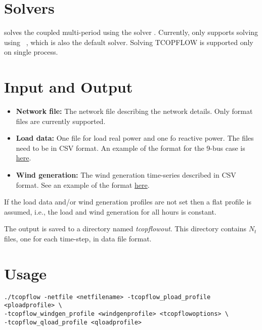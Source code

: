 \section{Solvers}\label{sec:tcopflow_solvers}%
\tcopflow solves the coupled multi-period using the solver \ipopt. Currently, \exago only supports solving \tcopflow using \ipopt~, which is also the default solver. Solving TCOPFLOW is supported only on single process. %

\section{Input and Output}
\begin{itemize}
    \item \textbf{Network file:} The network file describing the network details. Only \matpower format files are currently supported.
    \item \textbf{Load data:} One file for load real power and one fo reactive power. The files need to be in CSV format. An example of the format for the 9-bus case is \href{https://gitlab.pnnl.gov/exasgd/frameworks/exago/-/tree/master/datafiles/case9}{here}.
    \item \textbf{Wind generation:} The wind generation time-series described in CSV format. See an example of the format \href{https://gitlab.pnnl.gov/exasgd/frameworks/exago/-/tree/master/datafiles/case9}{here}.
\end{itemize}
If the load data and/or wind generation profiles are not set then a flat profile is assumed, i.e., the load and wind generation for all hours is constant.

The \tcopflow output is saved to a directory named \emph{tcopflowout}. This directory contains $N_t$ files, one for each time-step, in \matpower data file format.

\section{Usage}
\begin{lstlisting}
./tcopflow -netfile <netfilename> -tcopflow_pload_profile <ploadprofile> \
-tcopflow_windgen_profile <windgenprofile> <tcopflowoptions> \
-tcopflow_qload_profile <qloadprofile>
\end{lstlisting}

